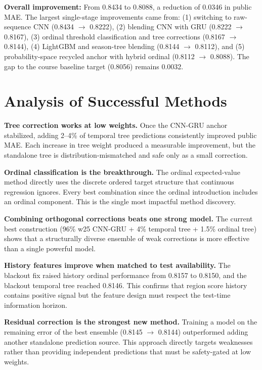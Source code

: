 \documentclass[12pt, a4paper]{article}
\begin{document}
\textbf{Overall improvement:} From 0.8434 to 0.8088, a reduction of 0.0346 in public MAE. The largest single-stage improvements came from: (1) switching to raw-sequence CNN (0.8434 $\rightarrow$ 0.8222), (2) blending CNN with GRU (0.8222 $\rightarrow$ 0.8167), (3) ordinal threshold classification and tree corrections (0.8167 $\rightarrow$ 0.8144), (4) LightGBM and season-tree blending (0.8144 $\rightarrow$ 0.8112), and (5) probability-space recycled anchor with hybrid ordinal (0.8112 $\rightarrow$ 0.8088). The gap to the course baseline target (0.8056) remains 0.0032.

\section{Analysis of Successful Methods}

\textbf{Tree correction works at low weights.} Once the CNN-GRU anchor stabilized, adding 2--4\% of temporal tree predictions consistently improved public MAE. Each increase in tree weight produced a measurable improvement, but the standalone tree is distribution-mismatched and safe only as a small correction.

\textbf{Ordinal classification is the breakthrough.} The ordinal expected-value method directly uses the discrete ordered target structure that continuous regression ignores. Every best combination since the ordinal introduction includes an ordinal component. This is the single most impactful method discovery.

\textbf{Combining orthogonal corrections beats one strong model.} The current best construction (96\% w25 CNN-GRU + 4\% temporal tree + 1.5\% ordinal tree) shows that a structurally diverse ensemble of weak corrections is more effective than a single powerful model.

\textbf{History features improve when matched to test availability.} The blackout fix raised history ordinal performance from 0.8157 to 0.8150, and the blackout temporal tree reached 0.8146. This confirms that region score history contains positive signal but the feature design must respect the test-time information horizon.

\textbf{Residual correction is the strongest new method.} Training a model on the remaining error of the best ensemble (0.8145 $\rightarrow$ 0.8144) outperformed adding another standalone prediction source. This approach directly targets weaknesses rather than providing independent predictions that must be safety-gated at low weights.
\end{document}
